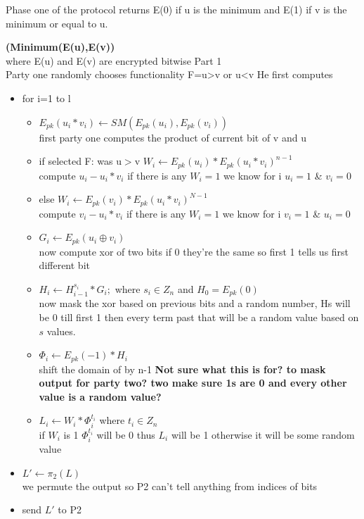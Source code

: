 \documentclass[10pt]{article} %
\begin{document}
Phase one of the protocol returns E(0) if u is the minimum and E(1) if v is the minimum or equal to u.

\textbf{(Minimum(E(u),E(v))}
\\where E(u) and E(v) are encrypted bitwise
Part 1\\
Party one randomly chooses functionality F=u>v or u<v
He first computes 
\begin{itemize}
	\item for i=1 to l 
	\begin{itemize}
		\item $E_{pk} (u_i * v_i ) \gets SM(E_{pk} (u_i) , E_{pk}(v_i))$
		\\ first party one computes the product of current bit of v and u
		\item if selected F: was u$>$v
		\subitem $W_i \gets E_{pk} (u_i) * E_{pk} (u_i * v_i)^{n-1}$
		\\compute $u_i - u_i*v_i $ if there is any $W_i=1$ we know for i $u_i=1$ \& $v_i=0$
		\item else
		\subitem $W_i \gets E_{pk} (v_i) * E_{pk} (u_i * v_i)^{N-1}$
		\\compute $v_i - u_i*v_i $  if there is any $W_i=1$ we know for i $v_i=1$ \& $u_i=0$
		\item $G_i \gets E_{pk}(u_i \oplus v_i)$
		\\now compute xor of two bits if 0 they're the same so first 1 tells us first different bit
		\item $H_i \gets H_{i-1}^{s_i} * G_i ;$ where $s_i \in Z_n$ and $H_0 = E_{pk}(0)$
		\\now mask the xor based on previous bits and a random number, Hs will be 0 till first 1 then every term past that will be a random value based on $s$ values.
		\item $\Phi_i \gets E_{pk}(-1) * H_i$
		\\shift the domain of by n-1
		\textbf{Not sure what this is for? to mask output for party two? two make sure 1s are 0 and every other value is a random value?}
		\item $L_i \gets W_i * \Phi_i^{t_i}$ where $t_i \in Z_n$
		\\ if $W_i$ is 1 $\Phi_i^{t_i}$ will be 0 thus $L_i$ will be 1 otherwise it will be some random value 
	\end{itemize}
	\item $L' \gets \pi_2(L)$
	\\we permute the output so P2 can't tell anything from indices of bits
	\item send $L'$ to P2
\end{itemize}
\end{document}
